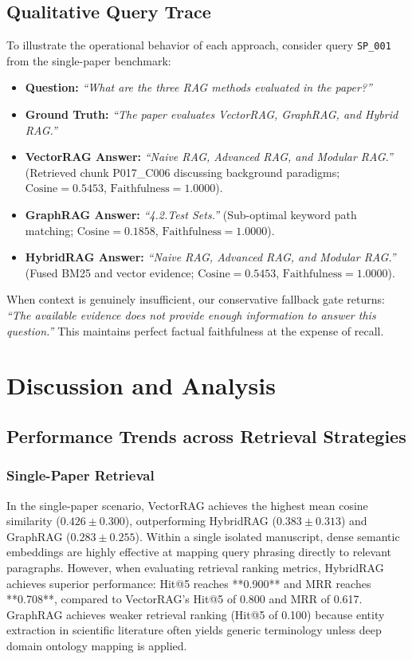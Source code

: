 \documentclass[conference]{IEEEtran}
\begin{document}
\subsection{Qualitative Query Trace}
To illustrate the operational behavior of each approach, consider query \texttt{SP\_001} from the single-paper benchmark:
\begin{itemize}
\item \textbf{Question:} \emph{``What are the three RAG methods evaluated in the paper?''}
\item \textbf{Ground Truth:} \emph{``The paper evaluates VectorRAG, GraphRAG, and Hybrid RAG.''}
\item \textbf{VectorRAG Answer:} \emph{``Naive RAG, Advanced RAG, and Modular RAG.''} (Retrieved chunk P017\_C006 discussing background paradigms; $\text{Cosine} = 0.5453$, $\text{Faithfulness} = 1.0000$).
\item \textbf{GraphRAG Answer:} \emph{``4.2.Test Sets.''} (Sub-optimal keyword path matching; $\text{Cosine} = 0.1858$, $\text{Faithfulness} = 1.0000$).
\item \textbf{HybridRAG Answer:} \emph{``Naive RAG, Advanced RAG, and Modular RAG.''} (Fused BM25 and vector evidence; $\text{Cosine} = 0.5453$, $\text{Faithfulness} = 1.0000$).
\end{itemize}
When context is genuinely insufficient, our conservative fallback gate returns: \emph{``The available evidence does not provide enough information to answer this question.''} This maintains perfect factual faithfulness at the expense of recall.


\section{Discussion and Analysis}

\subsection{Performance Trends across Retrieval Strategies}
\subsubsection{Single-Paper Retrieval}
In the single-paper scenario, VectorRAG achieves the highest mean cosine similarity ($0.426 \pm 0.300$), outperforming HybridRAG ($0.383 \pm 0.313$) and GraphRAG ($0.283 \pm 0.255$). Within a single isolated manuscript, dense semantic embeddings are highly effective at mapping query phrasing directly to relevant paragraphs. However, when evaluating retrieval ranking metrics, HybridRAG achieves superior performance: Hit@5 reaches **0.900** and MRR reaches **0.708**, compared to VectorRAG's Hit@5 of 0.800 and MRR of 0.617. GraphRAG achieves weaker retrieval ranking (Hit@5 of 0.100) because entity extraction in scientific literature often yields generic terminology unless deep domain ontology mapping is applied.
\end{document}
